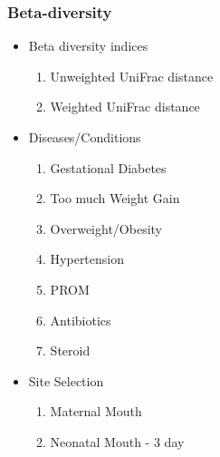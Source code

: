 \documentclass{beamer}
\begin{document}
    \begin{frame}
        \frametitle{Beta-diversity}

        \begin{itemize}
            \item Beta diversity indices
            \begin{enumerate}
                \item Unweighted UniFrac distance
                \item Weighted UniFrac distance
            \end{enumerate}

            \item Diseases/Conditions
            \begin{enumerate}
                \item Gestational Diabetes
                \item Too much Weight Gain
                \item Overweight/Obesity
                \item Hypertension
                \item PROM
                \item Antibiotics
                \item Steroid
            \end{enumerate}

            \item Site Selection
            \begin{enumerate}
                \item Maternal Mouth
                \item Neonatal Mouth - 3 day
            \end{enumerate}
        \end{itemize}
    \end{frame}
\end{document}
